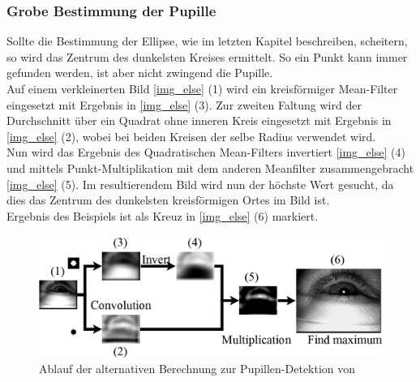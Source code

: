\subsubsection{Grobe Bestimmung der Pupille}
\label{ElSe_Grob}
Sollte die Bestimmung der Ellipse, wie im letzten Kapitel beschreiben, scheitern, so wird das Zentrum des dunkelsten Kreises ermittelt. So ein Punkt kann immer gefunden werden, ist aber nicht zwingend die Pupille.\\
Auf einem verkleinerten Bild \autoref{img_else} (1) wird ein kreisförmiger Mean-Filter eingesetzt mit Ergebnis in \autoref{img_else} (3). Zur zweiten Faltung wird der Durchschnitt über ein Quadrat ohne inneren Kreis eingesetzt mit Ergebnis in \autoref{img_else} (2), wobei bei beiden Kreisen der selbe Radius verwendet wird.\\
Nun wird das Ergebnis des Quadratischen Mean-Filters invertiert \autoref{img_else} (4) und mittels Punkt-Multiplikation mit dem anderen Meanfilter zusammengebracht \autoref{img_else} (5). Im resultierendem Bild wird nun der höchste Wert gesucht, da dies das Zentrum des dunkelsten kreisförmigen Ortes im Bild ist.\\
Ergebnis des Beispiels ist als Kreuz in \autoref{img_else} (6) markiert. 
\begin{figure}
	\centering
	\includegraphics[width=0.8\linewidth]{img/ElSe}
	\caption{Ablauf der alternativen Berechnung zur Pupillen-Detektion von \cite{ElSe}}
	\label{img_else}
\end{figure}